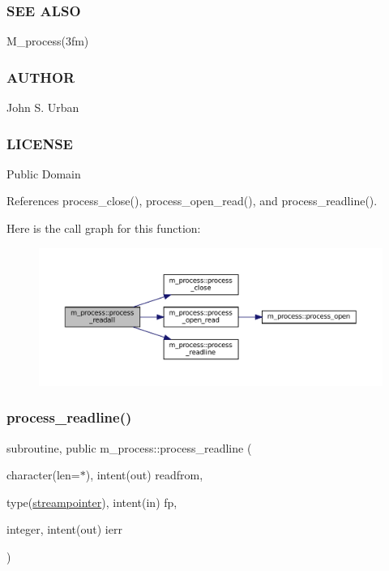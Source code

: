 \subsubsection*{S\+EE A\+L\+SO}

M\+\_\+process(3fm) \subsubsection*{A\+U\+T\+H\+OR}

John S. Urban \subsubsection*{L\+I\+C\+E\+N\+SE}

Public Domain 

References process\+\_\+close(), process\+\_\+open\+\_\+read(), and process\+\_\+readline().

Here is the call graph for this function\+:
\nopagebreak
\begin{figure}[H]
\begin{center}
\leavevmode
\includegraphics[width=350pt]{namespacem__process_a7dd759a1344789477ae1e205d7fa9a51_cgraph}
\end{center}
\end{figure}
\mbox{\label{namespacem__process_acbc72c5ed371430a471aa1f3010fbbda}} 
\subsubsection{\texorpdfstring{process\+\_\+readline()}{process\_readline()}}
{\footnotesize\ttfamily subroutine, public m\+\_\+process\+::process\+\_\+readline (\begin{DoxyParamCaption}\item[{character(len=$\ast$), intent(out)}]{readfrom,  }\item[{type(\mbox{\hyperlink{structm__process_1_1streampointer}{streampointer}}), intent(in)}]{fp,  }\item[{integer, intent(out)}]{ierr }\end{DoxyParamCaption})}




